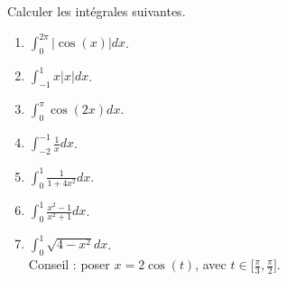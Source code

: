 
\begin{exercice}\label{exoTD5-0001}

	Calculer les intégrales suivantes.

	
		\begin{enumerate}
			\item
				$\displaystyle\int_0^{2\pi}| \cos(x) |dx$.
			\item
				$\displaystyle\int_{-1}^1x| x |dx$.
			\item
				$\displaystyle\int_0^{\pi}\cos(2x)dx$.
			\item
				$\displaystyle\int_{-2}^{-1}\frac{1}{ x }dx$.
			\item
				$\displaystyle\int_0^1\frac{1}{ 1+4x^2 }dx$.
			\item
				$\displaystyle\int_0^1\frac{ x^2-1 }{ x^2+1 }dx$.
			\item
				$\displaystyle\int_0^1\sqrt{4-x^2}dx$.\\Conseil : poser $x=2\cos(t)$, avec $t\in\mathopen[ \frac{ \pi }{ 3 } , \frac{ \pi }{ 2 } \mathclose]$.

		\end{enumerate}
	

\end{exercice}
